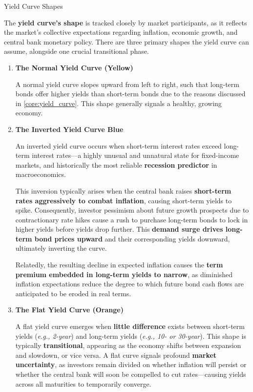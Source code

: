 \documentclass[10pt]{article}
\begin{document}
    \begin{core}[label=core:yield_shape]{Yield Curve Shapes}

      The \textbf{yield curve's shape} is tracked closely by market participants, as it reflects the market's collective expectations regarding inflation, economic growth, and central bank monetary policy. There are three primary shapes the yield curve can assume, alongside one crucial transitional phase.


      \begin{enumerate}

        \item \textbf{The Normal Yield Curve (Yellow)}

        A normal yield curve slopes upward from left to right, such that long-term bonds offer higher yields than short-term bonds due to the reasons discussed in \autoref{core:yield_curve}. This shape generally signals a healthy, growing economy. 

        \item \textbf{The Inverted Yield Curve {Blue}}

        An inverted yield curve occurs when short-term interest rates exceed long-term interest rates---a highly unusual and unnatural state for fixed-income markets, and historically the most reliable \textbf{recession predictor} in macroeconomics. 

        This inversion typically arises when the central bank raises \textbf{short-term rates aggressively to combat inflation}, causing short-term yields to spike. Consequently, investor pessimism about future growth prospects due to contractionary rate hikes cause a rush to purchase long-term bonds to lock in higher yields before yields drop further. This \textbf{demand surge drives long-term bond prices upward} and their corresponding yields downward, ultimately inverting the curve.

        Relatedly, the resulting decline in expected inflation causes the \textbf{term premium embedded in long-term yields to narrow}, as diminished inflation expectations reduce the degree to which future bond cash flows are anticipated to be eroded in real terms.

        \item \textbf{The Flat Yield Curve (Orange)}

        A flat yield curve emerges when \textbf{little difference} exists between short-term yields (\textit{e.g., 2-year}) and long-term yields (\textit{e.g., 10- or 30-year}). This shape is typically \textbf{transitional}, appearing as the economy shifts between expansion and slowdown, or vice versa. A flat curve signals profound \textbf{market uncertainty}, as investors remain divided on whether inflation will persist or whether the central bank will soon be compelled to cut rates---causing yields across all maturities to temporarily converge.


\end{enumerate}
\end{core}
\end{document}
